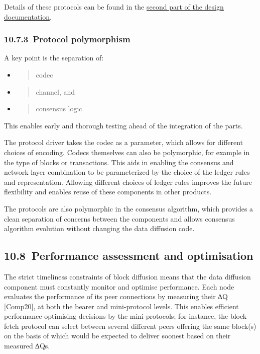 \documentclass[11pt,a4paper]{article}
\begin{document}
Details of these protocols can be found in the
\href{https://hydra.iohk.io/build/1011577/download/1/network.pdf}{{second
part of the design documentation}}.

\hypertarget{protocol-polymorphism}{%
\subsubsection{​10.7.3​~Protocol polymorphism
}\label{protocol-polymorphism}}

A key point is the separation of:

\begin{itemize}
\item
  \begin{quote}
  codec
  \end{quote}
\item
  \begin{quote}
  channel, and
  \end{quote}
\item
  \begin{quote}
  consensus logic
  \end{quote}
\end{itemize}

This enables early and thorough testing ahead of the integration of the
parts.

The protocol driver takes the codec as a parameter, which allows for
different choices of encoding. Codecs themselves can also be
polymorphic, for example in the type of blocks or transactions. This
aids in enabling the consensus and network layer combination to be
parameterized by the choice of the ledger rules and representation.
Allowing different choices of ledger rules improves the future
flexibility and enables reuse of these components in other products.

The protocols are also polymorphic in the consensus algorithm, which
provides a clean separation of concerns between the components and
allows consensus algorithm evolution without changing the data diffusion
code.

\hypertarget{performance-assessment-and-optimisation}{%
\subsection{​10.8​~Performance assessment and
optimisation}\label{performance-assessment-and-optimisation}}

The strict timeliness constraints of block diffusion means that the data
diffusion component must constantly monitor and optimise performance.
Each node evaluates the performance of its peer connections by measuring
their ∆Q {[}Comp20{]}, at both the bearer and mini-protocol levels. This
enables efficient performance-optimising decisions by the
mini-protocols; for instance, the block-fetch protocol can select
between several different peers offering the same block(s) on the basis
of which would be expected to deliver soonest based on their measured
∆Qs.
\end{document}
